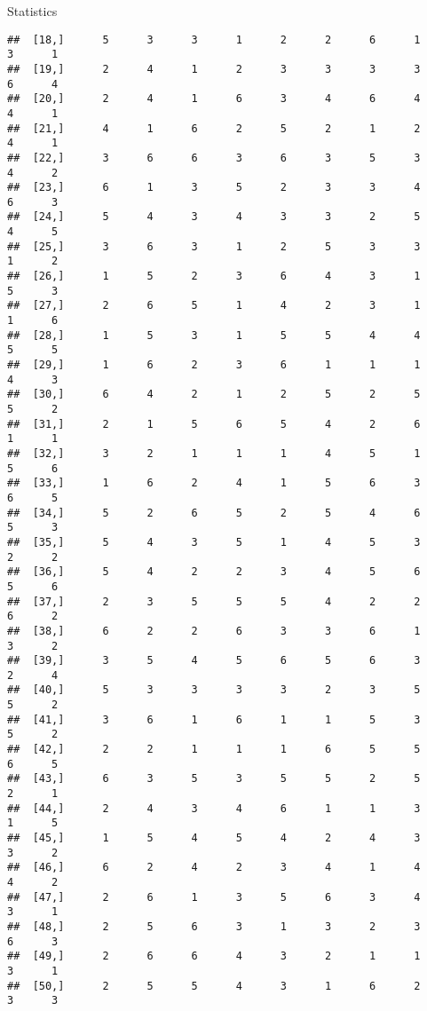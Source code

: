 \documentclass[
  ignorenonframetext,
]{beamer}
\begin{document}
\begin{frame}[fragile]{Statistics}
\begin{verbatim}
##  [18,]      5      3      3      1      2      2      6      1      3      1
##  [19,]      2      4      1      2      3      3      3      3      6      4
##  [20,]      2      4      1      6      3      4      6      4      4      1
##  [21,]      4      1      6      2      5      2      1      2      4      1
##  [22,]      3      6      6      3      6      3      5      3      4      2
##  [23,]      6      1      3      5      2      3      3      4      6      3
##  [24,]      5      4      3      4      3      3      2      5      4      5
##  [25,]      3      6      3      1      2      5      3      3      1      2
##  [26,]      1      5      2      3      6      4      3      1      5      3
##  [27,]      2      6      5      1      4      2      3      1      1      6
##  [28,]      1      5      3      1      5      5      4      4      5      5
##  [29,]      1      6      2      3      6      1      1      1      4      3
##  [30,]      6      4      2      1      2      5      2      5      5      2
##  [31,]      2      1      5      6      5      4      2      6      1      1
##  [32,]      3      2      1      1      1      4      5      1      5      6
##  [33,]      1      6      2      4      1      5      6      3      6      5
##  [34,]      5      2      6      5      2      5      4      6      5      3
##  [35,]      5      4      3      5      1      4      5      3      2      2
##  [36,]      5      4      2      2      3      4      5      6      5      6
##  [37,]      2      3      5      5      5      4      2      2      6      2
##  [38,]      6      2      2      6      3      3      6      1      3      2
##  [39,]      3      5      4      5      6      5      6      3      2      4
##  [40,]      5      3      3      3      3      2      3      5      5      2
##  [41,]      3      6      1      6      1      1      5      3      5      2
##  [42,]      2      2      1      1      1      6      5      5      6      5
##  [43,]      6      3      5      3      5      5      2      5      2      1
##  [44,]      2      4      3      4      6      1      1      3      1      5
##  [45,]      1      5      4      5      4      2      4      3      3      2
##  [46,]      6      2      4      2      3      4      1      4      4      2
##  [47,]      2      6      1      3      5      6      3      4      3      1
##  [48,]      2      5      6      3      1      3      2      3      6      3
##  [49,]      2      6      6      4      3      2      1      1      3      1
##  [50,]      2      5      5      4      3      1      6      2      3      3

\end{verbatim}
\end{frame}
\end{document}
